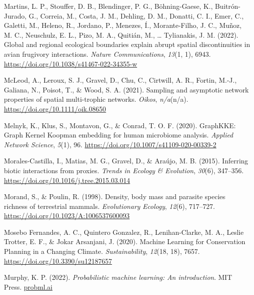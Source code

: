 \documentclass[11pt]{article}
\newlength{\cslhangindent}
\newenvironment{CSLReferences}[2] %
 {%
  \setlength{\parindent}{0pt}
  \ifodd #1 \everypar{\setlength{\hangindent}{\cslhangindent}}\ignorespaces\fi
  \ifnum #2 > 0
  \setlength{\parskip}{#2\baselineskip}
  \fi
 }%
 {}
\begin{document}
\begin{CSLReferences}{1}{0}
\leavevmode{}%
Martins, L. P., Stouffer, D. B., Blendinger, P. G., Böhning-Gaese, K.,
Buitrón-Jurado, G., Correia, M., Costa, J. M., Dehling, D. M., Donatti,
C. I., Emer, C., Galetti, M., Heleno, R., Jordano, P., Menezes, Í.,
Morante-Filho, J. C., Muñoz, M. C., Neuschulz, E. L., Pizo, M. A.,
Quitián, M., \ldots{} Tylianakis, J. M. (2022). Global and regional
ecological boundaries explain abrupt spatial discontinuities in avian
frugivory interactions. \emph{Nature Communications}, \emph{13}(1, 1),
6943. \url{https://doi.org/10.1038/s41467-022-34355-w}

\leavevmode{}%
McLeod, A., Leroux, S. J., Gravel, D., Chu, C., Cirtwill, A. R., Fortin,
M.-J., Galiana, N., Poisot, T., \& Wood, S. A. (2021). Sampling and
asymptotic network properties of spatial multi-trophic networks.
\emph{Oikos}, \emph{n/a}(n/a). \url{https://doi.org/10.1111/oik.08650}

\leavevmode{}%
Melnyk, K., Klus, S., Montavon, G., \& Conrad, T. O. F. (2020).
GraphKKE: Graph Kernel Koopman embedding for human microbiome analysis.
\emph{Applied Network Science}, \emph{5}(1), 96.
\url{https://doi.org/10.1007/s41109-020-00339-2}

\leavevmode{}%
Morales-Castilla, I., Matias, M. G., Gravel, D., \& Araújo, M. B.
(2015). Inferring biotic interactions from proxies. \emph{Trends in
Ecology \& Evolution}, \emph{30}(6), 347--356.
\url{https://doi.org/10.1016/j.tree.2015.03.014}

\leavevmode{}%
Morand, S., \& Poulin, R. (1998). Density, body mass and parasite
species richness of terrestrial mammals. \emph{Evolutionary Ecology},
\emph{12}(6), 717--727. \url{https://doi.org/10.1023/A:1006537600093}

\leavevmode{}%
Mosebo Fernandes, A. C., Quintero Gonzalez, R., Lenihan-Clarke, M. A.,
Leslie Trotter, E. F., \& Jokar Arsanjani, J. (2020). Machine Learning
for Conservation Planning in a Changing Climate. \emph{Sustainability},
\emph{12}(18, 18), 7657. \url{https://doi.org/10.3390/su12187657}

\leavevmode{}%
Murphy, K. P. (2022). \emph{Probabilistic machine learning: An
introduction}. MIT Press. \href{https://probml.ai}{probml.ai}


\end{CSLReferences}
\end{document}
